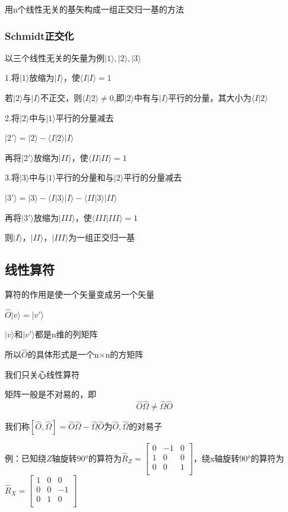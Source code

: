 \documentclass[lang=cn,10pt]{elegantbook}
\begin{document}
用n个线性无关的基矢构成一组正交归一基的方法

\subsubsection{Schmidt正交化}
以三个线性无关的矢量为例$|1\rangle,|2\rangle,|3\rangle$

1.将$|1\rangle$放缩为$|I\rangle$，使$\langle I|I\rangle=1$

若$|2\rangle$与$|I\rangle$不正交，则$\langle I|2\rangle\ne0$,即$|2\rangle$中有与$|I\rangle$平行的分量，其大小为$\langle I|2\rangle$

2.将$|2\rangle$中与$|1\rangle$平行的分量减去

$|2'\rangle=|2\rangle-\langle I|2\rangle|I\rangle$

再将$|2'\rangle$放缩为$|II\rangle$，使$\langle II|II\rangle=1$

3.将$|3\rangle$中与$|1\rangle$平行的分量和与$|2\rangle$平行的分量减去

$|3'\rangle=|3\rangle-\langle I|3\rangle|I\rangle-\langle II|3\rangle|II\rangle$

再将$|3'\rangle$放缩为$|III\rangle$，使$\langle III|III\rangle=1$

则$|I\rangle$，$|II\rangle$，$|III\rangle$为一组正交归一基
\subsection{线性算符}
算符的作用是使一个矢量变成另一个矢量

$\hat{O}|v\rangle =|v'\rangle$ 

$|v\rangle$和$|v'\rangle$都是n维的列矩阵

所以$\hat{O}$的具体形式是一个n$\times$n的方矩阵

我们只关心线性算符

矩阵一般是不对易的，即
\begin{equation*}
	\hat{O}\hat{\Omega}\ne \hat{\Omega}\hat{O}
\end{equation*}

我们称$\left[ \hat{O},\hat{\Omega} \right] =\hat{O}\hat{\Omega}-\hat{\Omega}\hat{O}
$为$\hat{O},\hat{\Omega}$的对易子

例：已知绕$Z$轴旋转90°的算符为$\hat{R}_Z=\left[ \begin{matrix}
	0&		-1&		0\\
	1&		0&		0\\
	0&		0&		1\\
\end{matrix} \right] $，绕x轴旋转90°的算符为$\hat{R}_X=\left[ \begin{matrix}
1&		0&		0\\
0&		0&		-1\\
0&		1&		0\\
\end{matrix} \right] $
\end{document}
